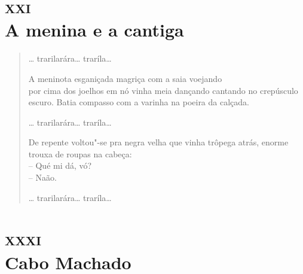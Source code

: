 \chapter[A menina e a cantiga]{\textsc{xxi}\\A menina e a cantiga}


\begin{verse}
\ldots{} trarilarára\ldots{} traríla\ldots{}

A meninota esganiçada magriça com a saia voejando\\
por cima dos joelhos em nó vinha meia dançando cantando no crepúsculo escuro. Batia compasso com a varinha na poeira da calçada.

\ldots{} trarilarára\ldots{} traríla\ldots{}

De repente voltou"-se pra negra velha que vinha trôpega atrás, enorme trouxa de roupas na cabeça:\\
-- Qué mi dá, vó?\\
-- Naão.

\ldots{} trarilarára\ldots{} traríla\ldots{}
\end{verse}

\chapter[Cabo Machado]{\textsc{xxxi}\\Cabo Machado}

